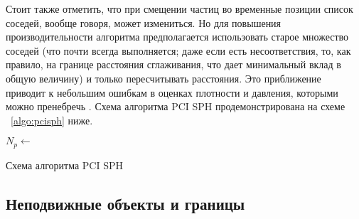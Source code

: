 Стоит также отметить, что при смещении частиц во временные позиции список соседей, вообще говоря, может измениться. Но для повышения производительности алгоритма предполагается использовать старое множество соседей (что почти всегда выполняется; даже если есть несоответствия, то, как правило, на границе расстояния сглаживания, что дает минимальный вклад в общую величину) и только пересчитывать расстояния. Это приближение приводит к небольшим ошибкам в оценках плотности и давления, которыми можно пренебречь \cite{Solenthaler2009}. Схема алгоритма PCI SPH продемонстрирована на схеме ~\ref{algo:pcisph} ниже.
\begin{algorithm}[H]
    \label{algo:pcisph}
    \SetAlgoLined

    {
        ${N_{p}} \leftarrow$ \;
    }
    \caption{Схема алгоритма PCI SPH}
\end{algorithm}

\subsection{Неподвижные объекты и границы}\label{subsec:ch1/sec4/sub2}

